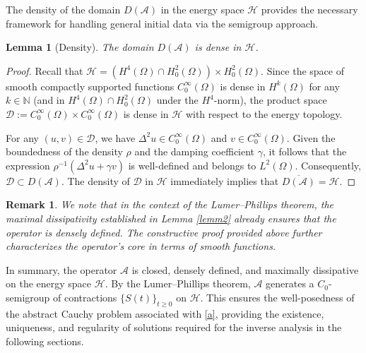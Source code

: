 \documentclass[12pt,reqno]{amsart}
\newtheorem{lemm}[theo]{Lemma}
\newtheorem{rema}[theo]{Remark}
\numberwithin{equation}{section}
\begin{document}
	
	The density of the domain $D(\mathcal{A})$ in the energy space $\mathcal{H}$ provides the necessary framework for handling general initial data via the semigroup approach.
	
	\begin{lemm}[Density] \label{lemm4}
		The domain $D(\mathcal{A})$ is dense in $\mathcal{H}$.
	\end{lemm}
	
	\begin{proof}
		Recall that $\mathcal{H} = (H^4(\Omega) \cap H_0^2(\Omega)) \times H_0^2(\Omega)$. Since the space of smooth compactly supported functions $C_0^\infty(\Omega)$ is dense in $H^k(\Omega)$ for any $k \in \mathbb{N}$ (and in $H^4(\Omega) \cap H_0^2(\Omega)$ under the $H^4$-norm), the product space $\mathcal{D} := C_0^\infty(\Omega) \times C_0^\infty(\Omega)$ is dense in $\mathcal{H}$ with respect to the energy topology.
		
		For any $(u, v) \in \mathcal{D}$, we have $\Delta^2 u \in C_0^\infty(\Omega)$ and $v \in C_0^\infty(\Omega)$. Given the boundedness of the density $\rho$ and the damping coefficient $\gamma$, it follows that the expression $\rho^{-1}(\Delta^2 u + \gamma v)$ is well-defined and belongs to $L^2(\Omega)$. Consequently, $\mathcal{D} \subset D(\mathcal{A})$. The density of $\mathcal{D}$ in $\mathcal{H}$ immediately implies that $\overline{D(\mathcal{A})} = \mathcal{H}$.
	\end{proof}
	
	\begin{rema}
		We note that in the context of the Lumer--Phillips theorem, the maximal dissipativity established in Lemma \ref{lemm2} already ensures that the operator is densely defined. The constructive proof provided above further characterizes the operator's core in terms of smooth functions.
	\end{rema}
	
	In summary, the operator $\mathcal{A}$ is closed, densely defined, and maximally dissipative on the energy space $\mathcal{H}$. By the Lumer--Phillips theorem, $\mathcal{A}$ generates a $C_0$-semigroup of contractions $\{S(t)\}_{t \ge 0}$ on $\mathcal{H}$. This ensures the well-posedness of the abstract Cauchy problem associated with \eqref{a}, providing the existence, uniqueness, and regularity of solutions required for the inverse analysis in the following sections.
	
	
	
	
	
	
	
\end{document}
